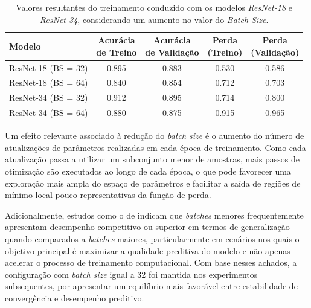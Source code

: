 \begin{table}[h]
	\centering
	\caption{Valores resultantes do treinamento conduzido com os modelos \textit{ResNet-18} e \textit{ResNet-34}, considerando um aumento no valor do \textit{Batch Size}.}
	\label{tab:comparacao_batchsize_resnet}
	\setlength{\tabcolsep}{3pt}

		\begin{tabular}{l|c|c|c|c}
			\toprule
			\textbf{Modelo} &
			\makecell{\textbf{Acurácia}\\ \textbf{de Treino}} &
			\makecell{\textbf{Acurácia}\\ \textbf{de Validação}} &
			\makecell{\textbf{Perda}\\ \textbf{(Treino)}} &
			\makecell{\textbf{Perda}\\ \textbf{(Validação)}} \\
			
			\midrule
			
			ResNet-18 (BS = 32)& 0.895 & 0.883 & 0.530 & 0.586 \\
			ResNet-18 (BS = 64) & 0.840 & 0.854 & 0.712 & 0.703 \\
			ResNet-34 (BS = 32)& 0.912 & 0.895 & 0.714 & 0.800 \\
			ResNet-34 (BS = 64) & 0.880 & 0.875 & 0.915 & 0.965 \\
			
			\bottomrule
		\end{tabular}
\end{table}


Um efeito relevante associado à redução do \textit{batch size} é o aumento do número de atualizações de parâmetros realizadas em cada época de treinamento. Como cada atualização passa a utilizar um subconjunto menor de amostras, mais passos de otimização são executados ao longo de cada época, o que pode favorecer uma exploração mais ampla do espaço de parâmetros e facilitar a saída de regiões de mínimo local pouco representativas da função de perda.

Adicionalmente, estudos como o de \cite{masters2018revisiting} indicam que \textit{batches} menores frequentemente apresentam desempenho competitivo ou superior em termos de generalização quando comparados a \textit{batches} maiores, particularmente em cenários nos quais o objetivo principal é maximizar a qualidade preditiva do modelo e não apenas acelerar o processo de treinamento computacional. Com base nesses achados, a configuração com \textit{batch size} igual a 32 foi mantida nos experimentos subsequentes, por apresentar um equilíbrio mais favorável entre estabilidade de convergência e desempenho preditivo. 

